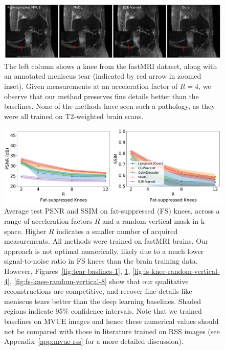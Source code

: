\begin{figure}[t]
\begin{center}
  \includegraphics[width=\columnwidth]{meniscus_tear_case_3_annotated-comp.pdf}
\end{center}
\caption{\small The left column shows a knee from the fastMRI dataset, along with an annotated meniscus tear (indicated by red arrow in zoomed inset). Given measurements at an acceleration factor of $R=4$, we observe that our method preserves fine details better than the baselines. None of the methods have seen such a pathology, as they were all trained on T2-weighted brain scans.}
\label{fig:tear-baslines-3}
\end{figure}

\begin{figure}
    \centering
    \includegraphics[width=\columnwidth]{fs-metrics-comp.pdf}
    \caption{\small Average test PSNR and SSIM on fat-suppressed (FS) knees, across a range of acceleration factors $R$ and a random vertical mask in k-space. Higher $R$ indicates a smaller number of acquired measurements. All methods were trained on fastMRI brains. Our approach is not optimal numerically, likely due to a much lower signal-to-noise ratio in FS knees than the brain training data. However, Figures~\ref{fig:tear-baslines-1}, \ref{fig:tear-baslines-3}, \ref{fig:fs-knee-random-vertical-4}, \ref{fig:fs-knee-random-vertical-8} show that our qualitative reconstructions are competitive, and recover fine details like meniscus tears better than the deep learning baselines. Shaded regions indicate 95\% confidence intervals. Note that we trained baselines on MVUE images and hence these numerical values should not be compared with those in literature trained on RSS images (see Appendix~\ref{app:mvue-rss} for a more detailed discussion).}
    \label{fig:fs-ssim-psnr}
\end{figure}

